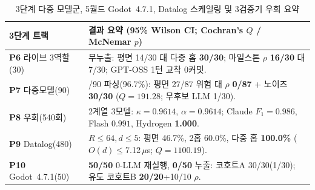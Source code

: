\begin{table}[!tbp]
\caption{3단계 다중 모델군, 5월드 Godot~4.7.1, Datalog 스케일링 및 3검증기 우회 요약}
\label{tab:phase3-compact}
\centering
\scriptsize
\setlength{\tabcolsep}{3pt}
\begin{tabularx}{\columnwidth}{@{}>{\raggedright\arraybackslash}p{}>{\raggedright\arraybackslash}X@{}}
\toprule
\textbf{3단계 트랙} & \textbf{결과 요약 (95\% Wilson CI; Cochran's $Q$ / McNemar $p$)} \\
\midrule
\textbf{P6} 라이브 3역할(30) & 무누출: 평면 14/30 대 다중 홉 \textbf{30/30}; 마일스톤 $\rho$ \textbf{16/30} 대 7/30; GPT-OSS 1턴 교착 0커밋. \\
\textbf{P7} 다중모델(90) & 87/90 파싱(96.7\%): 평면 27/87 위험 대 $\rho$ \textbf{0/87} + 노이즈 \textbf{30/30} ($Q{=}191.28$; 무후보 LLM 1/30). \\
\textbf{P8} 우회(540회) & 2계열 3모델: $\kappa{=}\mathbf{0.9614}$, $\alpha{=}\mathbf{0.9614}$; Claude $F_1{=}0.986$, Flash $0.991$, Hydrogen \textbf{1.000}. \\
\textbf{P9} Datalog(480) & $R{\le}64,d{\le}5$: 평면 46.7\%, 2홉 60.0\%, 다중 홉 \textbf{100.0\%} ($O(d)\le$7.12\,$\mu$s; $Q{=}1100.19$). \\
\textbf{P10} Godot~4.7.1(50) & \textbf{50/50} 0-LLM 재실행, \textbf{0/50} 누출: 코호트A 30/30(1/30); 유도 코호트B \textbf{20/20}+10/10 $\rho$. \\
\bottomrule
\end{tabularx}
\end{table}
